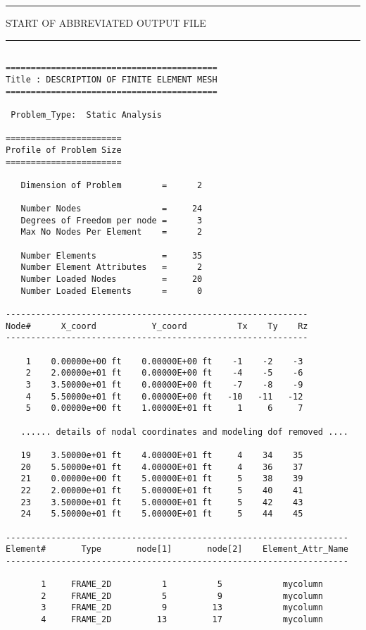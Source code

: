 \vspace{0.10 truein}
\begin{footnotesize}
\noindent
{\rule{1.7 in}{0.035 in} START OF ABBREVIATED OUTPUT FILE \rule{1.7 in}{0.035 in} }
\begin{verbatim}

==========================================
Title : DESCRIPTION OF FINITE ELEMENT MESH                                 
==========================================

 Problem_Type:  Static Analysis

=======================
Profile of Problem Size
=======================

   Dimension of Problem        =      2

   Number Nodes                =     24
   Degrees of Freedom per node =      3
   Max No Nodes Per Element    =      2

   Number Elements             =     35
   Number Element Attributes   =      2
   Number Loaded Nodes         =     20
   Number Loaded Elements      =      0

------------------------------------------------------------
Node#      X_coord           Y_coord          Tx    Ty    Rz  
------------------------------------------------------------

    1    0.00000e+00 ft    0.00000E+00 ft    -1    -2    -3 
    2    2.00000e+01 ft    0.00000E+00 ft    -4    -5    -6 
    3    3.50000e+01 ft    0.00000E+00 ft    -7    -8    -9 
    4    5.50000e+01 ft    0.00000E+00 ft   -10   -11   -12 
    5    0.00000e+00 ft    1.00000E+01 ft     1     6     7 

   ...... details of nodal coordinates and modeling dof removed ....

   19    3.50000e+01 ft    4.00000E+01 ft     4    34    35 
   20    5.50000e+01 ft    4.00000E+01 ft     4    36    37 
   21    0.00000e+00 ft    5.00000E+01 ft     5    38    39 
   22    2.00000e+01 ft    5.00000E+01 ft     5    40    41 
   23    3.50000e+01 ft    5.00000E+01 ft     5    42    43 
   24    5.50000e+01 ft    5.00000E+01 ft     5    44    45 

--------------------------------------------------------------------
Element#       Type       node[1]       node[2]    Element_Attr_Name
--------------------------------------------------------------------

       1     FRAME_2D          1          5            mycolumn
       2     FRAME_2D          5          9            mycolumn
       3     FRAME_2D          9         13            mycolumn
       4     FRAME_2D         13         17            mycolumn


\end{verbatim}
\end{footnotesize}
